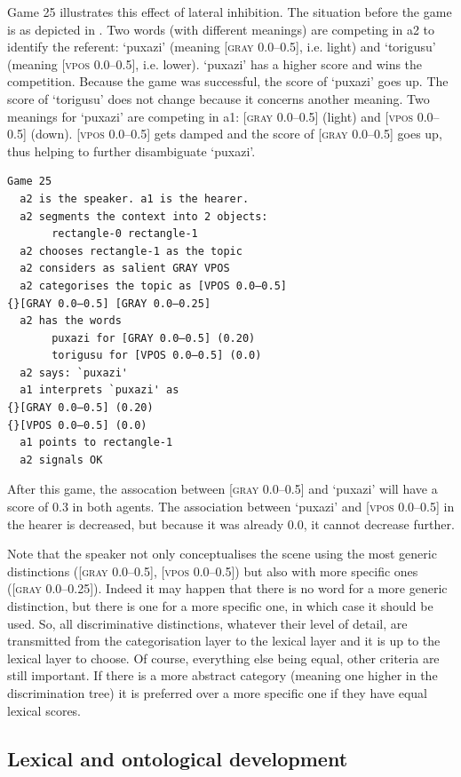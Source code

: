 Game 25 illustrates this effect of 
lateral inhibition. The situation before the game is 
as depicted in . 
Two words (with different meanings) are competing in {\bfshape  a2} to 
identify the referent: `puxazi' (meaning 
{}[\textsc{gray} 0.0–0.5], i.e. light) and `torigusu'
(meaning [\textsc{vpos} 0.0–0.5], i.e. lower).  `puxazi' has
a higher score and wins the competition. Because the game 
was successful, the score
of `puxazi' goes up. The score of `torigusu' 
does not change because it concerns another 
meaning. Two meanings for `puxazi'
are competing in {\bfshape  a1}: [\textsc{gray} 0.0–0.5] (light)
and [\textsc{vpos} 0.0–0.5] (down). [\textsc{vpos} 0.0–0.5] gets damped and 
the score of [\textsc{gray} 0.0–0.5] goes up, thus helping to 
further disambiguate `puxazi'. \clearpage
\begin{verbatim}
Game 25
  a2 is the speaker. a1 is the hearer. 
  a2 segments the context into 2 objects: 
       rectangle-0 rectangle-1 
  a2 chooses rectangle-1 as the topic 
  a2 considers as salient GRAY VPOS
  a2 categorises the topic as [VPOS 0.0–0.5] 
{}[GRAY 0.0–0.5] [GRAY 0.0–0.25]
  a2 has the words
       puxazi for [GRAY 0.0–0.5] (0.20)
       torigusu for [VPOS 0.0–0.5] (0.0)
  a2 says: `puxazi'
  a1 interprets `puxazi' as
{}[GRAY 0.0–0.5] (0.20)
{}[VPOS 0.0–0.5] (0.0)
  a1 points to rectangle-1
  a2 signals OK
\end{verbatim}
After this game, the assocation between [\textsc{gray} 0.0–0.5] 
and `puxazi' will have a score of 0.3 in both agents. 
The association between `puxazi' and [\textsc{vpos} 0.0–0.5] 
in the hearer is decreased, but because it was already 
0.0, it cannot decrease further. 

Note that the speaker not only conceptualises the scene using 
the most generic distinctions ([\textsc{gray} 0.0–0.5], 
{}[\textsc{vpos} 0.0–0.5]) but also
with more specific ones ([\textsc{gray} 0.0–0.25]). Indeed it 
may happen that there is no word for a more generic 
distinction, but there is one for a more specific 
one, in which case it should be used. 
So, all discriminative distinctions, 
whatever their level of detail, are
transmitted from the categorisation layer to the 
lexical layer and it is up to the lexical layer
to choose. Of course, everything else being equal, 
other criteria are still important. If there is a 
more abstract category (meaning one higher in the 
discrimination tree) it is preferred over a more 
specific one if they have equal lexical scores. 

\subsection{Lexical and ontological development} 

